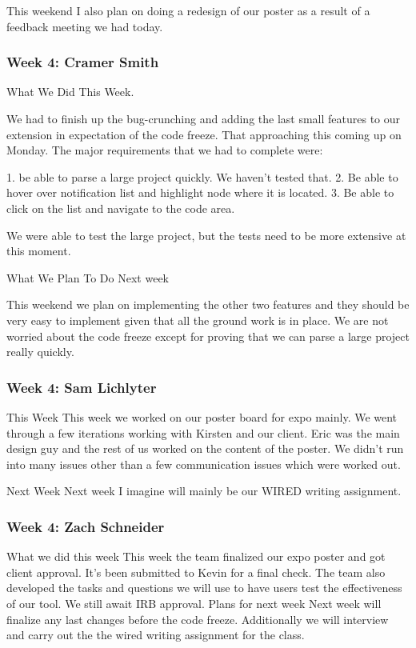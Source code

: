 This weekend I also plan on doing a redesign of our poster as a result of a feedback meeting we had today.

\subsubsection{Week 4: Cramer Smith}

What We Did This Week.

We had to finish up the bug-crunching and adding the last small features to our extension in expectation of the code freeze. That approaching this coming up on Monday. The major requirements that we had to complete were:

1. be able to parse a large project quickly. We haven't tested that. 
2. Be able to hover over notification list and highlight node where it is located.
3. Be able to click on the list and navigate to the code area.

We were able to test the large project, but the tests need to be more extensive at this moment. 

What We Plan To Do Next week

This weekend we plan on implementing the other two features and they should be very easy to implement given that all the ground work is in place. We are not worried about the code freeze except for proving that we can parse a large project really quickly. 

\subsubsection{Week 4: Sam Lichlyter}

This Week
This week we worked on our poster board for expo mainly. We went through a few iterations working with Kirsten and our client. Eric was the main design guy and the rest of us worked on the content of the poster. We didn't run into many issues other than a few communication issues which were worked out. 

Next Week
Next week I imagine will mainly be our WIRED writing assignment. 

\subsubsection{Week 4: Zach Schneider}

What we did this week
This week the team finalized our expo poster and got client approval. It's been submitted to Kevin for a final check. The team also developed the tasks and questions we will use to have users test the effectiveness of our tool. We still await IRB approval. 
Plans for next week
Next week will finalize any last changes before the code freeze. Additionally we will interview and carry out the the wired writing assignment for the class.

